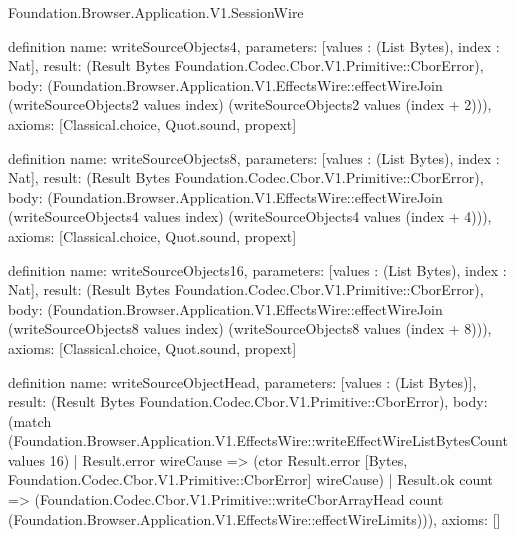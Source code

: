 \begin{lexlean}{Foundation.Browser.Application.V1.SessionWire}
\begin{semanticmodule}
definition{
  name: writeSourceObjects4,
  parameters: [values : (List Bytes), index : Nat],
  result: (Result Bytes Foundation.Codec.Cbor.V1.Primitive::CborError),
  body: (Foundation.Browser.Application.V1.EffectsWire::effectWireJoin (writeSourceObjects2 values index) (writeSourceObjects2 values (index + 2))),
  axioms: [Classical.choice, Quot.sound, propext]
}

definition{
  name: writeSourceObjects8,
  parameters: [values : (List Bytes), index : Nat],
  result: (Result Bytes Foundation.Codec.Cbor.V1.Primitive::CborError),
  body: (Foundation.Browser.Application.V1.EffectsWire::effectWireJoin (writeSourceObjects4 values index) (writeSourceObjects4 values (index + 4))),
  axioms: [Classical.choice, Quot.sound, propext]
}

definition{
  name: writeSourceObjects16,
  parameters: [values : (List Bytes), index : Nat],
  result: (Result Bytes Foundation.Codec.Cbor.V1.Primitive::CborError),
  body: (Foundation.Browser.Application.V1.EffectsWire::effectWireJoin (writeSourceObjects8 values index) (writeSourceObjects8 values (index + 8))),
  axioms: [Classical.choice, Quot.sound, propext]
}

definition{
  name: writeSourceObjectHead,
  parameters: [values : (List Bytes)],
  result: (Result Bytes Foundation.Codec.Cbor.V1.Primitive::CborError),
  body: (match (Foundation.Browser.Application.V1.EffectsWire::writeEffectWireListBytesCount values 16)
    | Result.error wireCause => (ctor Result.error [Bytes, Foundation.Codec.Cbor.V1.Primitive::CborError] wireCause)
    | Result.ok count => (Foundation.Codec.Cbor.V1.Primitive::writeCborArrayHead count (Foundation.Browser.Application.V1.EffectsWire::effectWireLimits))),
  axioms: []
}


\end{semanticmodule}
\end{lexlean}
